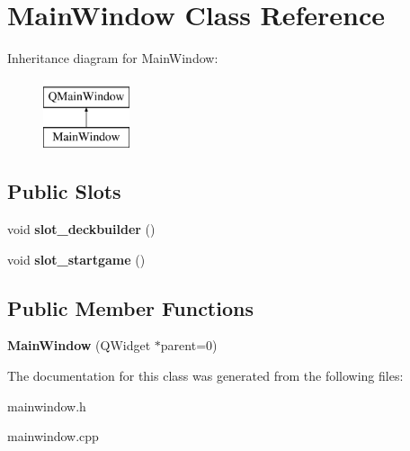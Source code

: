 \hypertarget{class_main_window}{}\section{Main\+Window Class Reference}
\label{class_main_window}
Inheritance diagram for Main\+Window\+:\begin{figure}[H]
\begin{center}
\leavevmode
\includegraphics[height=2.000000cm]{class_main_window}
\end{center}
\end{figure}
\subsection*{Public Slots}
\begin{DoxyCompactItemize}
\item 
\mbox{\label{class_main_window_a90e37d8ff96b5c5aef941aaa93f523f6}} 
void {\bfseries slot\+\_\+deckbuilder} ()
\item 
\mbox{\label{class_main_window_af01ad1b1153fd076e35909c09d46087b}} 
void {\bfseries slot\+\_\+startgame} ()
\end{DoxyCompactItemize}
\subsection*{Public Member Functions}
\begin{DoxyCompactItemize}
\item 
\mbox{\label{class_main_window_a8b244be8b7b7db1b08de2a2acb9409db}} 
{\bfseries Main\+Window} (Q\+Widget $\ast$parent=0)
\end{DoxyCompactItemize}


The documentation for this class was generated from the following files\+:\begin{DoxyCompactItemize}
\item 
mainwindow.\+h\item 
mainwindow.\+cpp\end{DoxyCompactItemize}
